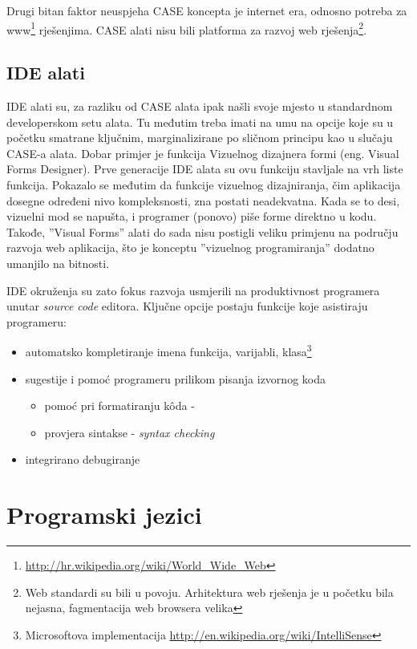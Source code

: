 \documentclass[times, utf8, seminar]{fit}
\begin{document}
Drugi bitan faktor neuspjeha CASE koncepta je internet era, odnosno potreba za www\footnote{\url{http://hr.wikipedia.org/wiki/World_Wide_Web}} rješenjima. CASE alati nisu bili platforma za razvoj web rješenja\footnote{Web standardi su bili u povoju. Arhitektura web rješenja je u početku bila nejasna, fagmentacija web browsera velika}.

\subsection{IDE alati}

IDE alati su, za razliku od CASE alata ipak našli svoje mjesto u standardnom developerskom setu alata. Tu međutim treba imati na umu na opcije koje su u početku smatrane ključnim, marginalizirane po sličnom principu kao u slučaju CASE-a alata. Dobar primjer je funkcija Vizuelnog dizajnera formi (eng. Visual Forms Designer). Prve generacije IDE alata su ovu funkciju stavljale na vrh liste funkcija. Pokazalo se međutim da funkcije vizuelnog dizajniranja, čim aplikacija dosegne određeni nivo kompleksnosti, zna postati neadekvatna. Kada se to desi, vizuelni mod se napušta, i programer (ponovo) piše forme direktno u kodu. Takođe, ''Visual Forms'' alati do sada nisu postigli veliku primjenu na području razvoja web aplikacija, što je konceptu ''vizuelnog programiranja'' dodatno umanjilo na bitnosti. 

IDE okruženja su zato fokus razvoja usmjerili na produktivnost programera unutar \emph{source code} editora. Ključne opcije postaju funkcije koje asistiraju programeru:
\begin{itemize}
  \item automatsko kompletiranje imena funkcija, varijabli, klasa\footnote{Microsoftova implementacija \url{http://en.wikipedia.org/wiki/IntelliSense}}
  \item sugestije i pomoć programeru prilikom pisanja izvornog koda 
     \begin{itemize}
        \item pomoć pri formatiranju k\^oda - 
        \item provjera sintakse - \emph{syntax checking}
      \end{itemize}
  \item integrirano debugiranje
\end{itemize}

\section{Programski jezici}
\end{document}
